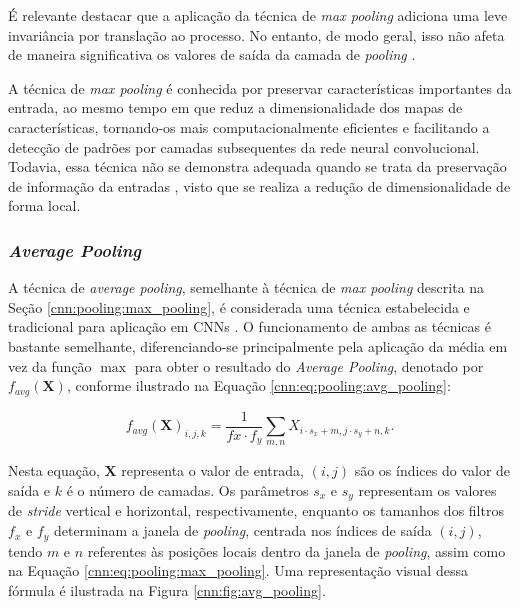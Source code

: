 É relevante destacar que a aplicação da técnica de \textit{max pooling} adiciona uma leve invariância por translação ao processo. No entanto, de modo geral, isso não afeta de maneira significativa os valores de saída da camada de \textit{pooling} \citep{Boureau2010ARecognition}.

A técnica de \textit{max pooling} é conhecida por preservar características importantes da entrada, ao mesmo tempo em que reduz a dimensionalidade dos mapas de características, tornando-os mais computacionalmente eficientes e facilitando a detecção de padrões por camadas subsequentes da rede neural convolucional. Todavia, essa técnica não se demonstra adequada quando se trata da preservação de informação da entradas \citep{Liu2019Multi-LevelNetworks}, visto que se realiza a redução de dimensionalidade de forma local.

\subsubsection{\textit{Average Pooling}}
\label{cnn:pooling:avg_pooling}
A técnica de \textit{average pooling}, semelhante à técnica de \textit{max pooling} descrita na Seção \ref{cnn:pooling:max_pooling}, é considerada uma técnica estabelecida e tradicional para aplicação em CNNs \citep{Zafar2022ANetworks, Paul2019DimensionalityPooling}. O funcionamento de ambas as técnicas é bastante semelhante, diferenciando-se principalmente pela aplicação da média em vez da função $\max$ para obter o resultado do \textit{Average Pooling}, denotado por $f_{avg}(\boldsymbol{X})$, conforme ilustrado na Equação \ref{cnn:eq:pooling:avg_pooling}:

\begin{equation}
    \label{cnn:eq:pooling:avg_pooling}
    f_{avg}(\boldsymbol{X})_{i, j, k} = \frac{1}{f{x} \cdot f_{y}} \sum_{m, n} X_{i \cdot s_x + m, j \cdot s_{y} + n, k}.
\end{equation}

Nesta equação, $\boldsymbol{X}$ representa o valor de entrada, $(i, j)$ são os índices do valor de saída e $k$ é o número de camadas. Os parâmetros $s_x$ e $s_y$ representam os valores de \textit{stride} vertical e horizontal, respectivamente, enquanto os tamanhos dos filtros $f_x$ e $f_y$ determinam a janela de \textit{pooling}, centrada nos índices de saída $(i,j)$, tendo $m$ e $n$ referentes às posições locais dentro da janela de \textit{pooling}, assim como na Equação \ref{cnn:eq:pooling:max_pooling}. Uma representação visual dessa fórmula é ilustrada na Figura \ref{cnn:fig:avg_pooling}.

